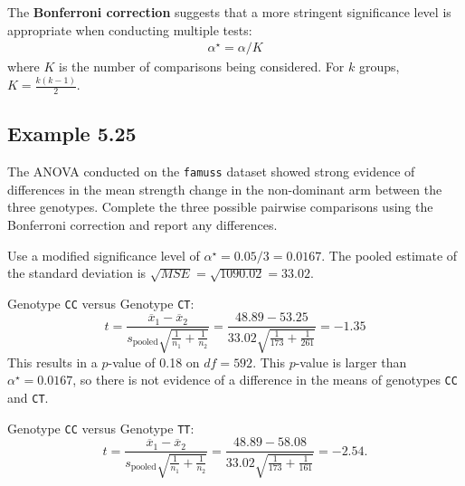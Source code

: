 \documentclass[
  letterpaper,
  DIV=11,
  numbers=noendperiod]{scrreprt}
\begin{document}
\begin{tcolorbox}[enhanced jigsaw, toptitle=1mm, colbacktitle=quarto-callout-note-color!10!white, breakable, leftrule=.75mm, left=2mm, opacityback=0, colframe=quarto-callout-note-color-frame, rightrule=.15mm, toprule=.15mm, bottomtitle=1mm, titlerule=0mm, title=\textcolor{quarto-callout-note-color}{\faInfo}\hspace{0.5em}{Bonferroni correction}, arc=.35mm, colback=white, bottomrule=.15mm, opacitybacktitle=0.6, coltitle=black]

The \textbf{Bonferroni correction} suggests that a more stringent
significance level is appropriate when conducting multiple tests:
\begin{align*}
\alpha^\star = \alpha / K
\end{align*} where \(K\) is the number of comparisons being considered.
For \(k\) groups, \(K=\frac{k(k-1)}{2}\).

\end{tcolorbox}

\hypertarget{example-5.25}{%
\subsection{Example 5.25}\label{example-5.25}}

The ANOVA conducted on the \texttt{famuss} dataset showed strong
evidence of differences in the mean strength change in the non-dominant
arm between the three genotypes. Complete the three possible pairwise
comparisons using the Bonferroni correction and report any differences.

Use a modified significance level of \(\alpha^\star = 0.05/3 = 0.0167\).
The pooled estimate of the standard deviation is
\(\sqrt{MSE} = \sqrt{1090.02} = 33.02\).

Genotype \texttt{CC} versus Genotype \texttt{CT}: \[
t = \frac{\overline{x}_1 - \overline{x}_2}{s_{\text{pooled}}\sqrt{\frac{1}{n_1} + \frac{1}{n_2}}} 
 = \dfrac{48.89 - 53.25}{33.02 \sqrt{\frac{1}{173} + \frac{1}{261}}} = -1.35
\] This results in a \(p\)-value of 0.18 on \(df =592\). This
\(p\)-value is larger than \(\alpha^\star = 0.0167\), so there is not
evidence of a difference in the means of genotypes \texttt{CC} and
\texttt{CT}.

Genotype \texttt{CC} versus Genotype \texttt{TT}: \[
t = \frac{\overline{x}_1 - \overline{x}_2}{s_{\text{pooled}}\sqrt{\frac{1}{n_1} + \frac{1}{n_2}}}
 = \dfrac{48.89 - 58.08}{33.02 \sqrt{\frac{1}{173} + \frac{1}{161}}} = -2.54.
\]
\end{document}
